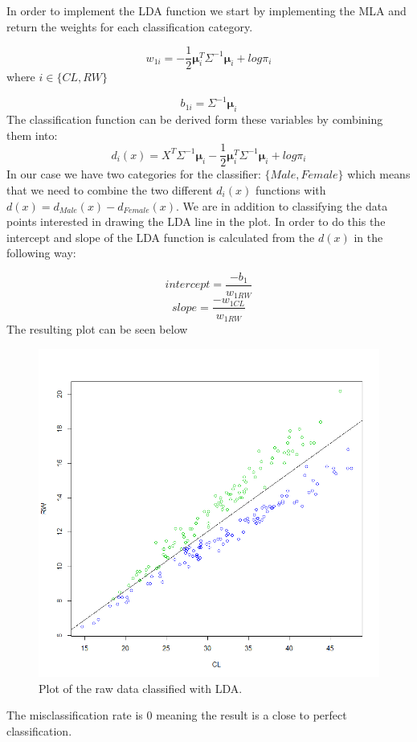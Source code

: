\documentclass[a4paper,12pt]{article}
\begin{document}
In order to implement the LDA function we start by implementing the MLA and return the weights for each classification category. 

\begin{equation}
    w_{1i} = -\frac{1}{2}\mathbf{\mu}^{T}_i\Sigma^{-1}\mathbf{\mu}_i+log \pi_i
\end{equation}
where $i \in \{CL,RW\}$

\begin{equation}
    b_{1i} = \Sigma^{-1}\mathbf{\mu}_i
\end{equation}
The classification function can be derived form these variables by combining them into:
\begin{equation}
  d_i(x) = X^T \Sigma^{-1}\mathbf{\mu}_i -\frac{1}{2}\mathbf{\mu}^{T}_i\Sigma^{-1}\mathbf{\mu}_i+log \pi_i
\end{equation}
In our case we have two categories for the classifier: $\{Male,Female\}$ which means that we need to combine the two different $d_i(x)$ functions with $d(x) = d_{Male}(x) - d_{Female}(x)$. We are in addition to classifying the data points interested in drawing the LDA line in the plot. In order to do this the intercept and slope of the LDA function is calculated from the $d(x)$ in the following way:

\begin{equation}
  intercept = \frac{-b_1}{w_{1RW}}
\end{equation}
\begin{equation}
  slope = \frac{-w_{1CL}}{w_{1RW}}
\end{equation}
The resulting plot can be seen below
\begin{figure}[H]
\centering
\begin{minipage}[]{0.5\textwidth}
  \includegraphics[width=\textwidth]{figures/lda_plot.png}  
  \caption{Plot of the raw data classified with LDA.\label{fig:lda_plot}}
 \end{minipage}
\end{figure}
The misclassification rate is 0 meaning the result is a close to perfect classification. 
\end{document}
